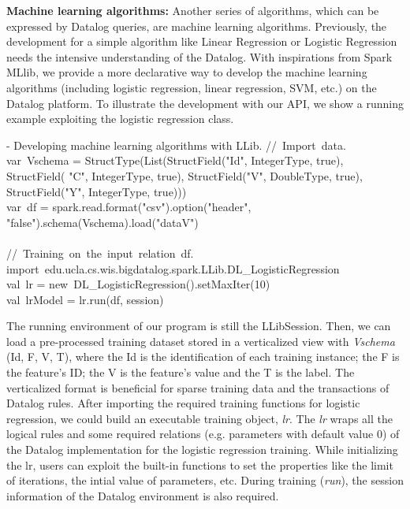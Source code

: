 \textbf{Machine learning algorithms:}
Another series of algorithms, which can be expressed by Datalog queries, are  machine learning algorithms.  Previously, the development for a simple algorithm like Linear Regression or Logistic Regression needs the intensive understanding of the Datalog. With inspirations from Spark MLlib, we provide a more declarative way to develop the machine learning algorithms (including logistic regression, linear regression, SVM, etc.)  on the Datalog platform. 
To illustrate the development with our API, we show a running example exploiting the logistic regression class.

\vspace{0.5em}
 - Developing machine learning algorithms with LLib.
\vspace{-2em}
\bldl
//\ Import\ data. 
\\
var\ Vschema = StructType(List(StructField("Id", IntegerType, true), \\StructField(
"C", IntegerType, true),
StructField("V", DoubleType, true),\\ StructField("Y", IntegerType, true))) \\

var\ df = spark.read.format("csv").option("header", "false").schema(Vschema).load("dataV") \\
\\
//\ Training\ on\ the\ input\ relation\ df. \\
import\ edu.ucla.cs.wis.bigdatalog.spark.LLib.DL\_LogisticRegression \\
val\ lr = new\  DL\_LogisticRegression().setMaxIter(10) \\
val\ lrModel = lr.run(df, session)

\eldl
The running environment of our program is still the LLibSession. Then, we can load a pre-processed training dataset stored in a verticalized view with \textit{Vschema} (Id, F, V, T), where the Id is the identification of each training instance; the F is the feature's ID; the V is the feature's value and the T is the label. The verticalized format is beneficial for sparse training data and the transactions of Datalog rules.   After importing the required training functions for logistic regression, we could build an executable training object, \textit{lr}. The \textit{lr} wraps all the logical rules and some required relations (e.g. parameters with default value 0) of the Datalog implementation for the logistic regression training.  While initializing the lr, users can exploit the built-in functions to set the properties like the limit of  iterations, the intial value of parameters, etc. During training (\textit{run}), the session information of the Datalog environment is also required. 

